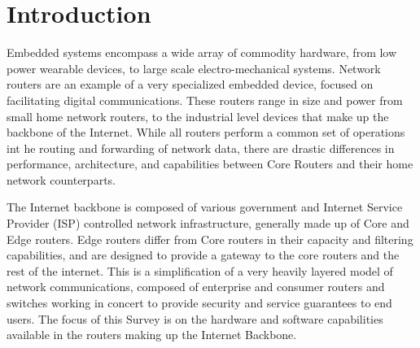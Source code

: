 \section{Introduction}
Embedded systems encompass a wide array of commodity hardware, from low power wearable devices, to large scale electro-mechanical systems. Network routers are an example of a very specialized embedded device, focused on facilitating digital communications. These routers range in size and power from small home network routers, to the industrial level devices that make up the backbone of the Internet. While all routers perform a common set of operations int he routing and forwarding of network data, there are drastic differences in performance, architecture, and capabilities between Core Routers and their home network counterparts.

The Internet backbone is composed of various government and Internet Service Provider (ISP) controlled network infrastructure, generally made up of Core and Edge routers\cite{zhang_detecting_2009}. Edge routers differ from Core routers in their capacity and filtering capabilities, and are designed to provide a gateway to the core routers and the rest of the internet. This is a simplification of a very heavily layered model of network communications, composed of enterprise and consumer routers and switches working in concert to provide security and service guarantees to end users. The focus of this Survey is on the hardware and software capabilities available in the routers making up the Internet Backbone.

